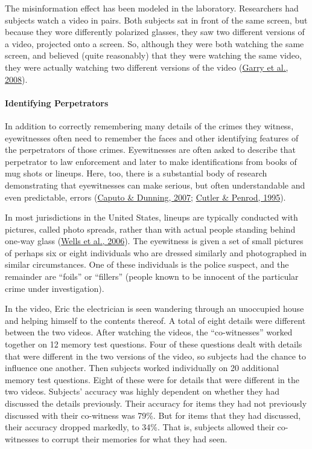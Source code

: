 \documentclass[
]{krantz}
\begin{document}
The misinformation effect has been modeled in the laboratory. Researchers had subjects watch a video in pairs. Both subjects sat in front of the same screen, but because they wore differently polarized glasses, they saw two different versions of a video, projected onto a screen. So, although they were both watching the same screen, and believed (quite reasonably) that they were watching the same video, they were actually watching two different versions of the video (\protect\hyperlink{ref-garry2008eyewitness}{Garry et al., 2008}).

\hypertarget{identifying-perpetrators}{%
\paragraph*{Identifying Perpetrators}\label{identifying-perpetrators}}

In addition to correctly remembering many details of the crimes they witness, eyewitnesses often need to remember the faces and other identifying features of the perpetrators of those crimes. Eyewitnesses are often asked to describe that perpetrator to law enforcement and later to make identifications from books of mug shots or lineups. Here, too, there is a substantial body of research demonstrating that eyewitnesses can make serious, but often understandable and even predictable, errors (\protect\hyperlink{ref-caputo2007distinguishing}{Caputo \& Dunning, 2007}; \protect\hyperlink{ref-cutler1995mistaken}{Cutler \& Penrod, 1995}).

In most jurisdictions in the United States, lineups are typically conducted with pictures, called photo spreads, rather than with actual people standing behind one-way glass (\protect\hyperlink{ref-wells2006eyewitness}{Wells et al., 2006}). The eyewitness is given a set of small pictures of perhaps six or eight individuals who are dressed similarly and photographed in similar circumstances. One of these individuals is the police suspect, and the remainder are ``foils'' or ``fillers'' (people known to be innocent of the particular crime under investigation).

In the video, Eric the electrician is seen wandering through an unoccupied house and helping himself to the contents thereof. A total of eight details were different between the two videos. After watching the videos, the ``co-witnesses'' worked together on 12 memory test questions. Four of these questions dealt with details that were different in the two versions of the video, so subjects had the chance to influence one another. Then subjects worked individually on 20 additional memory test questions. Eight of these were for details that were different in the two videos. Subjects' accuracy was highly dependent on whether they had discussed the details previously. Their accuracy for items they had not previously discussed with their co-witness was 79\%. But for items that they had discussed, their accuracy dropped markedly, to 34\%. That is, subjects allowed their co-witnesses to corrupt their memories for what they had seen.
\end{document}
